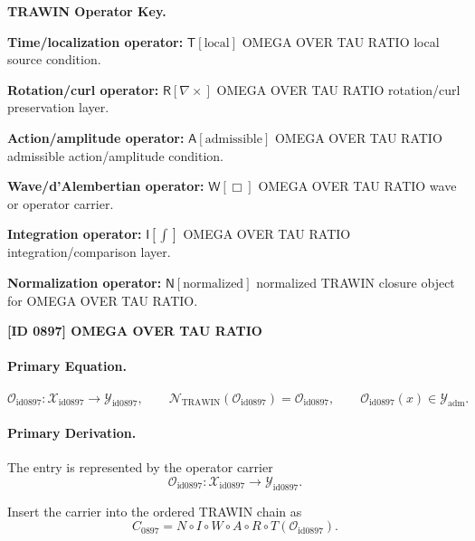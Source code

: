 \par\vspace{0.45\baselineskip}
\noindent\begin{minipage}[t]{\linewidth}
\begingroup
\small
\raggedright
\textbf{TRAWIN Operator Key.}\par
\noindent\textbf{Time/localization operator:} $\mathsf{T}\!\left[\mathrm{local}\right]$ OMEGA OVER TAU RATIO local source condition.\par
\noindent\textbf{Rotation/curl operator:} $\mathsf{R}\!\left[\nabla\times\right]$ OMEGA OVER TAU RATIO rotation/curl preservation layer.\par
\noindent\textbf{Action/amplitude operator:} $\mathsf{A}\!\left[\mathrm{admissible}\right]$ OMEGA OVER TAU RATIO admissible action/amplitude condition.\par
\noindent\textbf{Wave/d'Alembertian operator:} $\mathsf{W}\!\left[\Box\right]$ OMEGA OVER TAU RATIO wave or operator carrier.\par
\noindent\textbf{Integration operator:} $\mathsf{I}\!\left[\int\right]$ OMEGA OVER TAU RATIO integration/comparison layer.\par
\noindent\textbf{Normalization operator:} $\mathsf{N}\!\left[\mathrm{normalized}\right]$ normalized TRAWIN closure object for OMEGA OVER TAU RATIO.\par
\endgroup
\end{minipage}

\clearpage
\noindent\textbf{[ID 0897] OMEGA OVER TAU RATIO}\par
\vspace{0.35em}
\paragraph{Primary Equation.}
\[
\mathcal{O}_{\mathrm{id0897}}:\mathcal{X}_{\mathrm{id0897}}\longrightarrow \mathcal{Y}_{\mathrm{id0897}},\qquad
\mathcal{N}_{\mathrm{TRAWIN}}(\mathcal{O}_{\mathrm{id0897}})=\mathcal{O}_{\mathrm{id0897}},\qquad
\mathcal{O}_{\mathrm{id0897}}(x)\in\mathcal{Y}_{\mathrm{adm}}.
\]

\paragraph{Primary Derivation.} The entry is represented by the operator carrier\[
\mathcal{O}_{\mathrm{id0897}}:\mathcal{X}_{\mathrm{id0897}}\longrightarrow \mathcal{Y}_{\mathrm{id0897}}.
\]

Insert the carrier into the ordered TRAWIN chain as\[
C_{0897}=N\circ I\circ W\circ A\circ R\circ T(\mathcal{O}_{\mathrm{id0897}}).
\]

